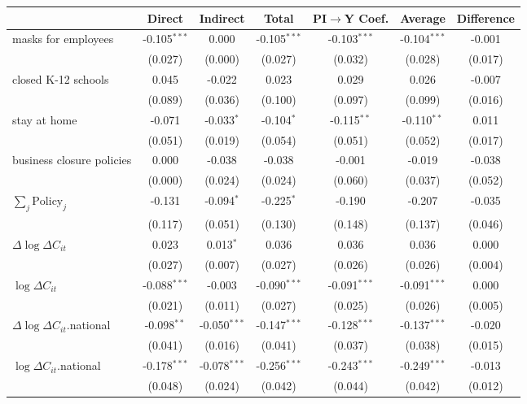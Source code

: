 
\begin{tabular}{lccccc|>{}c}
\toprule
  & Direct & Indirect & Total & PI$\to$Y Coef. & Average & Difference\\
\midrule
masks for employees & -0.105$^{***}$ & 0.000 & -0.105$^{***}$ & -0.103$^{***}$ & -0.104$^{***}$ & -0.001\\
 & (0.027) & (0.000) & (0.027) & (0.032) & (0.028) & (0.017)\\
closed K-12 schools & 0.045 & -0.022 & 0.023 & 0.029 & 0.026 & -0.007\\
 & (0.089) & (0.036) & (0.100) & (0.097) & (0.099) & (0.016)\\
stay at home & -0.071 & -0.033$^{*}$ & -0.104$^{*}$ & -0.115$^{**}$ & -0.110$^{**}$ & 0.011\\
 & (0.051) & (0.019) & (0.054) & (0.051) & (0.052) & (0.017)\\
business closure policies & 0.000 & -0.038 & -0.038 & -0.001 & -0.019 & -0.038\\
 & (0.000) & (0.024) & (0.024) & (0.060) & (0.037) & (0.052)\\
$\sum_j \mathrm{Policy}_j$ & -0.131 & -0.094$^{*}$ & -0.225$^{*}$ & -0.190 & -0.207 & -0.035\\
 & (0.117) & (0.051) & (0.130) & (0.148) & (0.137) & (0.046)\\
$\Delta \log \Delta C_{it}$ & 0.023 & 0.013$^{*}$ & 0.036 & 0.036 & 0.036 & 0.000\\
 & (0.027) & (0.007) & (0.027) & (0.026) & (0.026) & (0.004)\\
$\log \Delta C_{it}$ & -0.088$^{***}$ & -0.003 & -0.090$^{***}$ & -0.091$^{***}$ & -0.091$^{***}$ & 0.000\\
 & (0.021) & (0.011) & (0.027) & (0.025) & (0.026) & (0.005)\\
$\Delta \log \Delta C_{it}$.national & -0.098$^{**}$ & -0.050$^{***}$ & -0.147$^{***}$ & -0.128$^{***}$ & -0.137$^{***}$ & -0.020\\
 & (0.041) & (0.016) & (0.041) & (0.037) & (0.038) & (0.015)\\
$\log \Delta C_{it}$.national & -0.178$^{***}$ & -0.078$^{***}$ & -0.256$^{***}$ & -0.243$^{***}$ & -0.249$^{***}$ & -0.013\\
 & (0.048) & (0.024) & (0.042) & (0.044) & (0.042) & (0.012)\\
\bottomrule
\end{tabular}
